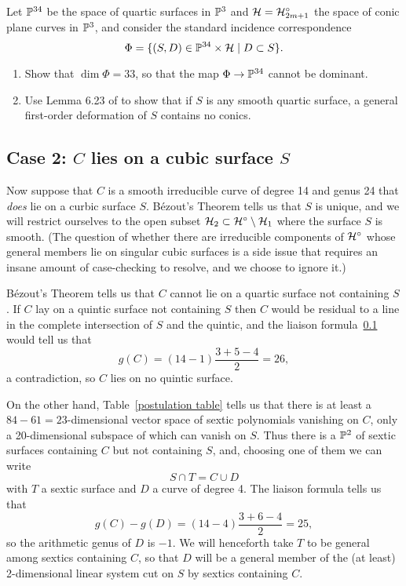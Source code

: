 \begin{exercise}\label{quartics conics}
Let ${\mathbb P}^{34}$ be the space of quartic surfaces in ${\mathbb P}^3$ and ${\cal H} = {\cal H}^\circ_{2m+1}$ the space of conic plane curves in ${\mathbb P}^3$, and consider the standard incidence correspondence
$$
\Phi = \{(S,D) \in {\mathbb P}^{34} \times {\cal H} \mid D \subset S \}.
$$
\begin{enumerate}
\item Show that $\dim \Phi = 33$, so that the map $\Phi \to {\mathbb P}^{34}$ cannot be dominant.
\item Use Lemma 6.23 of \cite{3264} to show that if $S$ is any smooth quartic surface, a general first-order deformation of $S$ contains no conics.
\end{enumerate}
\end{exercise}


\subsection{Case 2: $C$ lies on a cubic surface $S$}

Now suppose that $C$ is a smooth irreducible curve of degree 14 and genus 24 that \emph{does} lie on a curbic surface $S$. B\'ezout's Theorem tells us that  $S$  is unique, and we will restrict ourselves to the open subset ${\cal H}_2 \subset {\cal H}^\circ \setminus {\cal H}_1$ where the surface $S$ is smooth.  (The question of whether there are irreducible components of ${\cal H}^\circ$ whose general members lie on singular cubic surfaces is a side issue that requires an insane amount of case-checking to resolve, and we choose to ignore it.) 

B\'ezout's Theorem tells us that $C$ cannot lie on a quartic surface not containing $S$. If $C$ lay on a quintic surface not containing $S$ then $C$ would be residual to a line in the complete intersection of $S$ and the quintic, and the liaison formula~\ref{} would tell us that 
$$
g(C) = (14-1)\frac{3+5-4}{2} = 26,
$$
a contradiction, so $C$ lies on no quintic surface.

On the other hand, Table~\ref{postulation table} tells us that there is at least a $84-61 = 23$-dimensional vector space of sextic polynomials vanishing on  $C$, only a 20-dimensional subspace of which can vanish on $S$. Thus there is a ${\mathbb P}^2$ of sextic surfaces containing $C$ but not containing $S$, and, choosing one of them we can write
$$
S \cap T = C \cup D
$$
with $T$ a sextic surface and $D$ a curve of degree 4. The liaison formula  tells us that
$$
g(C) - g(D) = (14 - 4)\frac{3+6-4}{2} = 25,
$$
so the arithmetic genus of $D$ is $-1$. We will henceforth take $T$ to be general among sextics containing $C$, so that $D$ will be a general member of the (at least) 2-dimensional linear system cut on $S$ by sextics containing $C$.

